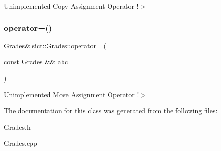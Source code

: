 Unimplemented Copy Assignment Operator !$>$ \mbox{\label{classsict_1_1_grades_a7fb3ef65024df1e61764fabfa223fe00}} 
\subsubsection{\texorpdfstring{operator=()}{operator=()}\hspace{0.1cm}{\footnotesize\ttfamily [2/2]}}
{\footnotesize\ttfamily \mbox{\hyperlink{classsict_1_1_grades}{Grades}}\& sict\+::\+Grades\+::operator= (\begin{DoxyParamCaption}\item[{const \mbox{\hyperlink{classsict_1_1_grades}{Grades}} \&\&}]{abc }\end{DoxyParamCaption})\hspace{0.3cm}{\ttfamily [delete]}}

Unimplemented Move Assignment Operator !$>$ 

The documentation for this class was generated from the following files\+:\begin{DoxyCompactItemize}
\item 
Grades.\+h\item 
Grades.\+cpp\end{DoxyCompactItemize}
